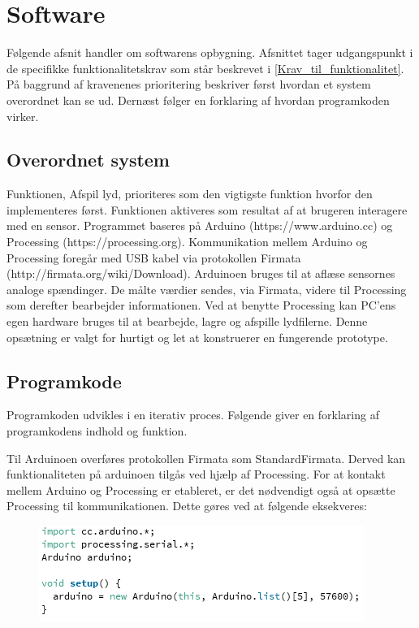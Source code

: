 \chapter{Software}
\label{software}
Følgende afsnit handler om softwarens opbygning. Afsnittet tager udgangspunkt i de specifikke funktionalitetskrav som står beskrevet i \autoref{Krav_til_funktionalitet}. På baggrund af kravenenes prioritering beskriver først hvordan et system overordnet kan se ud. Dernæst følger en  forklaring af hvordan programkoden virker.
 
\section{Overordnet system}
Funktionen, Afspil lyd, prioriteres som den vigtigste funktion hvorfor den implementeres først. Funktionen aktiveres som resultat af at brugeren interagere med en sensor.   
Programmet baseres på Arduino (https://www.arduino.cc) og Processing (https://processing.org). Kommunikation mellem Arduino og Processing foregår med USB kabel via protokollen Firmata (http://firmata.org/wiki/Download). 
 Arduinoen bruges til at aflæse sensornes analoge spændinger. De målte værdier sendes, via Firmata, videre til Processing som derefter bearbejder informationen.
 Ved at benytte Processing kan PC'ens egen hardware bruges til at bearbejde, lagre og afspille lydfilerne. Denne opsætning er valgt for hurtigt og let at konstruerer en fungerende prototype.  

\section{Programkode}
Programkoden udvikles i en iterativ proces. Følgende giver en forklaring af programkodens indhold og funktion.  

Til Arduinoen overføres protokollen Firmata som StandardFirmata. Derved kan funktionaliteten på arduinoen tilgås ved hjælp af Processing. For at  kontakt mellem Arduino og Processing er etableret, er det nødvendigt også at opsætte Processing til kommunikationen. Dette gøres ved at følgende eksekveres:

\begin{figure}[H]
\includegraphics[scale=0.8]{Figure/programkode01.png}
\end{figure}
  
